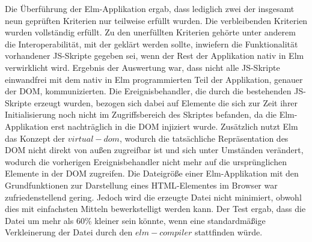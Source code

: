 Die Überführung der Elm-Applikation ergab, dass lediglich zwei der insgesamt neun geprüften Kriterien nur teilweise erfüllt wurden. Die verbleibenden Kriterien wurden vollständig erfüllt. Zu den unerfüllten Kriterien gehörte unter anderem die Interoperabilität, mit der geklärt werden sollte, inwiefern die Funktionalität vorhandener \ac{JS}-Skripte gegeben sei, wenn der Rest der Applikation nativ in Elm verwirklicht wird. Ergebnis der Auswertung war, dass nicht alle \ac{JS}-Skripte einwandfrei mit dem nativ in Elm programmierten Teil der Applikation, genauer der \ac{DOM}, kommunizierten. Die Ereignisbehandler, die durch die bestehenden \ac{JS}-Skripte erzeugt wurden, bezogen sich dabei auf Elemente die sich zur Zeit ihrer Initialisierung noch nicht im Zugriffsbereich des Skriptes befanden, da die Elm-Applikation erst nachträglich in die \ac{DOM} injiziert wurde. Zusätzlich nutzt Elm das Konzept der $virtual-dom$, wodurch die tatsächliche Repräsentation des \ac{DOM} nicht direkt von außen zugreifbar ist und sich unter Umständen verändert, wodurch die vorherigen Ereignisbehandler nicht mehr auf die ursprünglichen Elemente in der \ac{DOM} zugreifen. Die Dateigröße einer Elm-Applikation mit den Grundfunktionen zur Darstellung eines \ac{HTML}-Elementes im Browser war zufriedenstellend gering. Jedoch wird die erzeugte Datei nicht minimiert, obwohl dies mit einfachsten Mitteln bewerkstelligt werden kann. Der Test ergab, dass die Datei um mehr als 60\% kleiner sein könnte, wenn eine standardmäßige Verkleinerung der Datei durch den $elm-compiler$ stattfinden würde.

